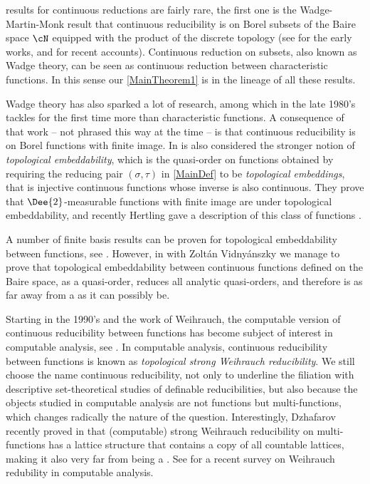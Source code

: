 \Wqo{} results for continuous reductions are fairly rare, the first one is the Wadge-Martin-Monk result that continuous reducibility is \wqo{} on Borel subsets
of the Baire space $\cN$ equipped with the product of the discrete topology (see \cite{wadge,cabal2} for the early works, and \cite{articolo_raphael,CMRSWadge} for recent accounts).
Continuous reduction on subsets, also known as Wadge theory, can be seen as continuous reduction between characteristic functions.
In this sense our \cref{MainTheorem1} is in the lineage of all these results.

Wadge theory has also sparked a lot of research, among which \cite{vEMSbqo} in the late 1980's tackles for the first time more than characteristic functions.
A consequence of that work -- not phrased this way at the time -- is that continuous reducibility is \wqo{} on Borel functions with finite image.
In \cite{vEMSbqo} is also considered the stronger notion of \emph{topological embeddability},
which is the quasi-order on functions obtained by requiring the reducing pair $(\sigma,\tau)$ in \cref{MainDef}
to be \emph{topological embeddings}, that is injective continuous functions whose inverse is also continuous.
They prove that $\Dee{2}$-measurable functions with finite image are \wqo{} under topological embeddability, and recently Hertling gave a description of this class of functions \cite{MR4133716}.

A number of finite basis results can be proven for topological embeddability between functions, see \cite{soleckidecomposing,pawlikowski2012decomposing,debs2012,carroymiller2}.
However,  in \cite{embeddabilityCPZ} with Zolt\'an Vidny\'anszky we manage to prove that topological embeddability between continuous functions defined on the Baire space,
as a quasi-order, reduces all analytic quasi-orders, and therefore is as far away from a \wqo{} as it can possibly be.

Starting in the 1990's and the work of Weihrauch, the computable version of continuous reducibility between functions has become subject of interest in computable analysis, see \cite{her-wei}.
In computable analysis, continuous reducibility between functions is known as \emph{topological strong Weihrauch reducibility}. We still choose the name continuous reducibility, not only
to underline the filiation with descriptive set-theoretical studies of definable reducibilities, but also because the objects studied in computable analysis are not functions but multi-functions, which changes radically the nature of the question.
Interestingly, Dzhafarov recently proved in \cite{MR4028100} that (computable) strong Weihrauch reducibility on multi-functions has a lattice structure that contains a copy of all
countable lattices, making it also very far from being a \wqo{}. See \cite{MR4300761} for a recent survey on Weihrauch redubility in computable analysis.

